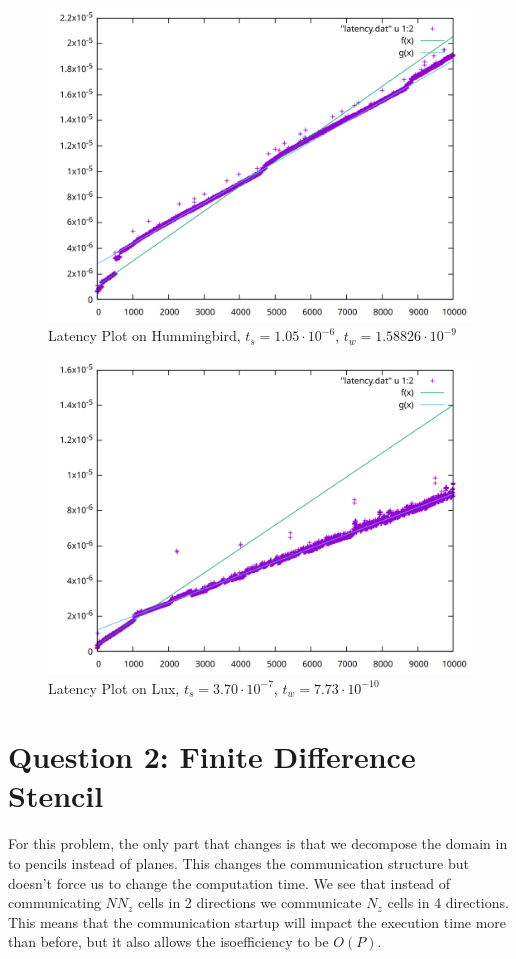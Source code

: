 \documentclass{article}
\begin{document}
    \begin{figure}
        \centering
        \includegraphics[width=.8\textwidth]{hblatency.png}
        \caption{Latency Plot on Hummingbird, $t_s = 1.05\cdot10^{-6}$, $t_w =
        1.58826\cdot10^{-9}$}
    \end{figure}

    \begin{figure}
        \centering
        \includegraphics[width=.8\textwidth]{luxlatency.png}
        \caption{Latency Plot on Lux, $t_s = 3.70\cdot10^{-7}$, $t_w =
        7.73\cdot10^{-10}$}
    \end{figure}

              
               
\section*{Question 2: Finite Difference Stencil}
    For this problem, the only part that changes is that we decompose the
    domain in to pencils instead of planes. This changes the communication
    structure but doesn't force us to change the computation time. 
    We see that instead of communicating  $NN_z$ cells in 2 directions we communicate
    $N_z$ cells in 4 directions. This means that the communication startup will impact the
    execution time more than before, but it also allows the isoefficiency to be
    $O(P)$. 
    \setcounter{section}{2}
\end{document}
